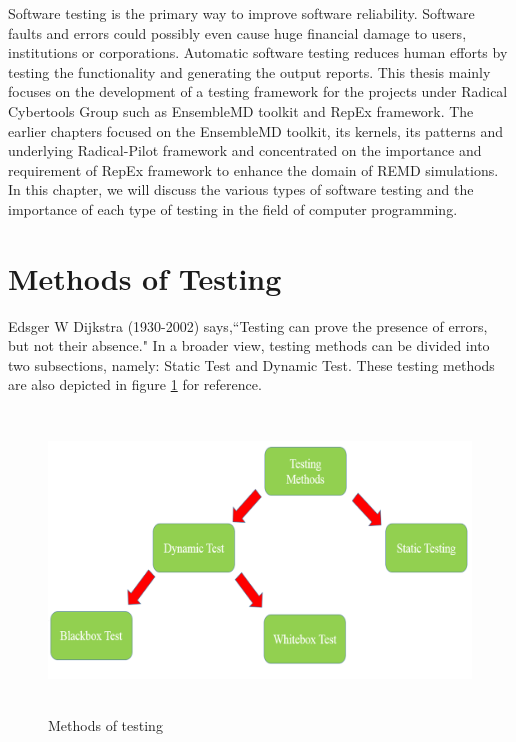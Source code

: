 \documentclass[10pt]{ruthesis}
\begin{document}
Software testing is the primary way to improve software reliability. Software faults and errors could possibly even cause huge financial damage to users, institutions or corporations. Automatic software testing reduces human efforts by testing the functionality and generating the output reports. This thesis mainly focuses on the development of a testing framework for the projects under Radical Cybertools Group such as EnsembleMD toolkit and RepEx framework. The earlier chapters focused on the EnsembleMD toolkit, its kernels, its patterns and underlying Radical-Pilot framework and concentrated on the importance and requirement of RepEx framework to enhance the domain of REMD simulations. In this chapter, we will discuss the various types of software testing and the importance of each type of testing in the field of computer programming.

\section{Methods of Testing}

Edsger W Dijkstra (1930-2002) says,``Testing can prove the presence of errors, but not their absence." In a broader view, testing methods can be divided into two subsections, namely: Static Test and Dynamic Test. These testing methods are also depicted in figure \ref{fig:test_met} for reference.

\begin{figure}
  \centering
  \includegraphics[width=17cm,height=8cm]{test_method.png}
  \caption{Methods of testing}
  \label{fig:test_met}
\end{figure}
\end{document}

